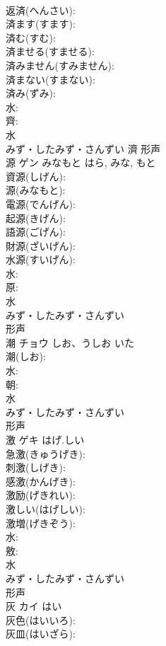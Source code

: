 \documentclass[8pt]{extreport}
\begin{document}
\begin{CJK}{UTF8}{min}
\\	返済(へんさい): 
\\	済ます(すます): 
\\	済む(すむ): 
\\	済ませる(すませる): 
\\	済みません(すみません): 
\\	済まない(すまない): 
\\	済み(ずみ): 
\\	水: 
\\	齊: 
\\	水	
\\	みず・したみず・さんずい	濟	形声 
\\	源	ゲン	みなもと	はら, みな, もと	
\\	資源(しげん): 
\\	源(みなもと): 
\\	電源(でんげん): 
\\	起源(きげん): 
\\	語源(ごげん): 
\\	財源(ざいげん): 
\\	水源(すいげん): 
\\	水: 
\\	原: 
\\	水	
\\	みず・したみず・さんずい	
\\	形声 
\\	潮	チョウ	しお、うしお	いた	
\\	潮(しお): 
\\	水: 
\\	朝: 
\\	水	
\\	みず・したみず・さんずい	
\\	形声 
\\	激	ゲキ	はげ.しい		
\\	急激(きゅうげき): 
\\	刺激(しげき): 
\\	感激(かんげき): 
\\	激励(げきれい): 
\\	激しい(はげしい): 
\\	激増(げきぞう): 
\\	水: 
\\	敫: 
\\	水	
\\	みず・したみず・さんずい	
\\	形声 
\\	灰	カイ	はい		
\\	灰色(はいいろ): 
\\	灰皿(はいざら): 

\end{CJK}
\end{document}

